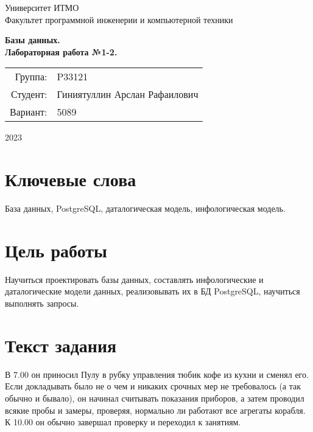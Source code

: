 \documentclass{article}
\begin{document}
\begin{titlepage}
    \begin{center}
        \begin{spacing}{1.4}
            \large{Университет ИТМО} \\
            \large{Факультет программной инженерии и компьютерной техники} \\
        \end{spacing}
        \vfill
        \textbf{
            \huge{Базы данных.} \\
            \huge{Лабораторная работа №1-2.} \\
        }
    \end{center}
    \vfill
    \begin{center}
        \begin{tabular}{r l}
            Группа:  & P33121                  \\
            Студент: & Гиниятуллин Арслан Рафаилович \\
            Вариант: & 5089
        \end{tabular}
    \end{center}
    \vfill
    \begin{center}
        \begin{large}
            2023
        \end{large}
    \end{center}
\end{titlepage}

\section*{Ключевые слова}

База данных, PostgreSQL,
даталогическая модель,
инфологическая модель.

\tableofcontents

\section{Цель работы}

Научиться проектировать базы данных,
составлять инфологические и
даталогические модели данных,
реализовывать их в БД
PostgreSQL, научиться выполнять
запросы.

\section{Текст задания}

В 7.00 он приносил Пулу в рубку управления тюбик кофе из кухни и сменял его. Если докладывать было не о чем и никаких срочных мер не требовалось (а так обычно и бывало), он начинал считывать показания приборов, а затем проводил всякие пробы и замеры, проверяя, нормально ли работают все агрегаты корабля. К 10.00 он обычно завершал проверку и переходил к занятиям.
\end{document}
